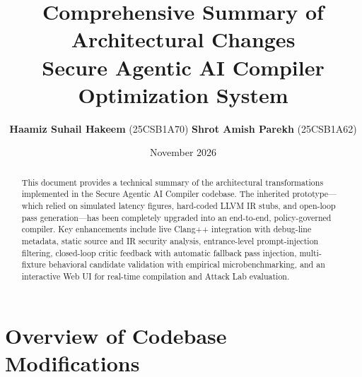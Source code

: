 \documentclass[11pt]{article}
\title{\vspace{-1.2em}\textbf{Comprehensive Summary of Architectural Changes}\\
\large Secure Agentic AI Compiler Optimization System}
\author{\textbf{Haamiz Suhail Hakeem} (25CSB1A70) \quad \textbf{Shrot Amish Parekh} (25CSB1A62)}
\date{November 2026}
\begin{document}
\maketitle
\vspace{-1.5em}

\begin{abstract}
This document provides a technical summary of the architectural transformations implemented in the Secure Agentic AI Compiler codebase. The inherited prototype---which relied on simulated latency figures, hard-coded LLVM IR stubs, and open-loop pass generation---has been completely upgraded into an end-to-end, policy-governed compiler. Key enhancements include live Clang++ integration with debug-line metadata, static source and IR security analysis, entrance-level prompt-injection filtering, closed-loop critic feedback with automatic fallback pass injection, multi-fixture behavioral candidate validation with empirical microbenchmarking, and an interactive Web UI for real-time compilation and Attack Lab evaluation.
\end{abstract}

\section{Overview of Codebase Modifications}
\end{document}
